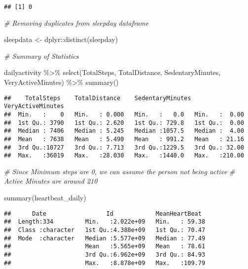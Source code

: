 \documentclass[
]{article}
\newenvironment{Shaded}{\begin{snugshade}}{\end{snugshade}}
\newcommand{\CommentTok}[1]{\textcolor[rgb]{0.56,0.35,0.01}{\textit{#1}}}
\newcommand{\FunctionTok}[1]{\textcolor[rgb]{0.00,0.00,0.00}{#1}}
\newcommand{\NormalTok}[1]{#1}
\newcommand{\OtherTok}[1]{\textcolor[rgb]{0.56,0.35,0.01}{#1}}
\newcommand{\SpecialCharTok}[1]{\textcolor[rgb]{0.00,0.00,0.00}{#1}}
\begin{document}
\begin{verbatim}
## [1] 0
\end{verbatim}

\begin{Shaded}
\begin{Highlighting}[]
\CommentTok{\# Removing duplicates from sleepday dataframe}

\NormalTok{sleepdata }\OtherTok{\textless{}{-}}\NormalTok{ dplyr}\SpecialCharTok{::}\FunctionTok{distinct}\NormalTok{(sleepday)}

\CommentTok{\# Summary of Statistics}

\NormalTok{dailyactivity }\SpecialCharTok{\%\textgreater{}\%}  
  \FunctionTok{select}\NormalTok{(TotalSteps,}
\NormalTok{         TotalDistance,}
\NormalTok{         SedentaryMinutes,}
\NormalTok{         VeryActiveMinutes) }\SpecialCharTok{\%\textgreater{}\%}
  \FunctionTok{summary}\NormalTok{()}
\end{Highlighting}
\end{Shaded}

\begin{verbatim}
##    TotalSteps    TotalDistance    SedentaryMinutes VeryActiveMinutes
##  Min.   :    0   Min.   : 0.000   Min.   :   0.0   Min.   :  0.00   
##  1st Qu.: 3790   1st Qu.: 2.620   1st Qu.: 729.8   1st Qu.:  0.00   
##  Median : 7406   Median : 5.245   Median :1057.5   Median :  4.00   
##  Mean   : 7638   Mean   : 5.490   Mean   : 991.2   Mean   : 21.16   
##  3rd Qu.:10727   3rd Qu.: 7.713   3rd Qu.:1229.5   3rd Qu.: 32.00   
##  Max.   :36019   Max.   :28.030   Max.   :1440.0   Max.   :210.00
\end{verbatim}

\begin{Shaded}
\begin{Highlighting}[]
\CommentTok{\# Since Minimum steps are 0, we can assume the person not being active}
\CommentTok{\# Active Minutes are around 210}

\FunctionTok{summary}\NormalTok{(heartbeat\_daily)}
\end{Highlighting}
\end{Shaded}

\begin{verbatim}
##      Date                 Id            MeanHeartBeat   
##  Length:334         Min.   :2.022e+09   Min.   : 59.38  
##  Class :character   1st Qu.:4.388e+09   1st Qu.: 70.47  
##  Mode  :character   Median :5.577e+09   Median : 77.49  
##                     Mean   :5.565e+09   Mean   : 78.61  
##                     3rd Qu.:6.962e+09   3rd Qu.: 84.93  
##                     Max.   :8.878e+09   Max.   :109.79
\end{verbatim}
\end{document}

